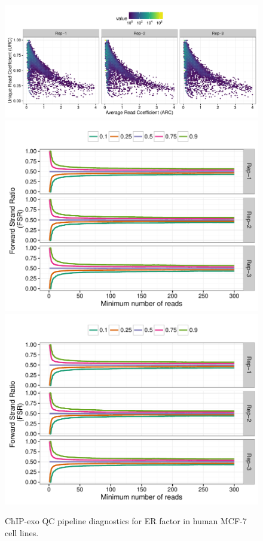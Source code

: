 \documentclass{article}
\begin{document}
\begin{figure}[H]
  \centering
  \includegraphics[width = .75\textwidth,page =
1]{figures/supplement/QC/Carroll_ER_MCF7_enrichment.pdf}\\
\includegraphics[width = .65\textwidth,page =
1]{figures/supplement/QC/Carroll_ER_MCF7_strand_imbalance.pdf}
\includegraphics[width = .65\textwidth,page =
3]{figures/supplement/QC/Carroll_ER_MCF7_strand_imbalance.pdf}
  \caption{ChIP-exo QC pipeline diagnostics for ER factor in human MCF-7 cell lines.}
  \label{sfig:qc4}
\end{figure}
\end{document}
